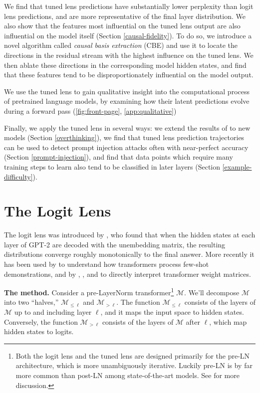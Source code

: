 \documentclass{article}
\theoremstyle{plain}
\theoremstyle{definition}
\begin{document}
We find that tuned lens predictions have substantially lower perplexity than logit lens predictions, and are more representative of the final layer distribution. We also show that the features most influential on the tuned lens output are also influential on the model itself (Section \ref{causal-fidelity}). To do so, we introduce a novel algorithm called \emph{causal basis extraction} (CBE) and use it to locate the directions in the residual stream with the highest influence on the tuned lens. We then ablate these directions in the corresponding model hidden states, and find that these features tend to be disproportionately influential on the model output.

We use the tuned lens to gain qualitative insight into the computational process of pretrained language models, by examining how their latent predictions evolve during a forward pass (\cref{fig:front-page}, \cref{app:qualitative})

Finally, we apply the tuned lens in several ways: we extend the results of \citet{halawi2023overthinking} to new models (Section \ref{overthinking}), we find that tuned lens prediction trajectories can be used to detect prompt injection attacks \cite{perez2022ignore} often with near-perfect accuracy (Section \ref{prompt-injection}), and find that data points which require many training steps to learn also tend to be classified in later layers (Section \ref{example-difficulty}).

\section{The Logit Lens}
\label{logit-lens}

The logit lens was introduced by \citet{nostalgebraist2020logitlens}, who found that when the hidden states at each layer of GPT-2 \citep{radford2019language} are decoded with the unembedding matrix, the resulting distributions converge roughly monotonically to the final answer. More recently it has been used by \citet{halawi2023overthinking} to understand how transformers process few-shot demonstrations, and by \citet{dar2022analyzing}, \citet{geva2022transformer}, and \citet{millidge2022svd} to directly interpret transformer weight matrices.

\textbf{The method.} Consider a pre-LayerNorm transformer\footnote{Both the logit lens and the tuned lens are designed primarily for the pre-LN architecture, which is more unambiguously iterative. Luckily pre-LN is by far more common than post-LN among state-of-the-art models. See \citet[Appendix C]{zhang2020accelerating} for more discussion.} $\mathcal{M}$. We'll decompose $\mathcal{M}$ into two ``halves,'' $\mathcal{M}_{\leq\ell}$ and $\mathcal{M}_{>\ell}$. The function $\mathcal{M}_{\leq\ell}$ consists of the layers of $\mathcal{M}$ up to and including layer $\ell$, and it maps the input space to hidden states. Conversely, the function $\mathcal{M}_{>\ell}$ consists of the layers of $\mathcal{M}$ after $\ell$, which map hidden states to logits.
\end{document}
